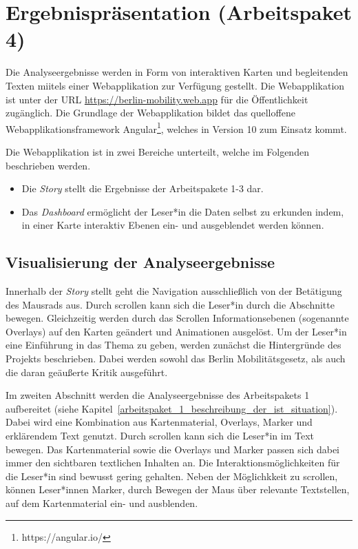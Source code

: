 \newpage

\section{Ergebnispräsentation (Arbeitspaket 4)}
\label{ergebnispraesentation}

Die Analyseergebnisse werden in Form von interaktiven Karten und begleitenden Texten miitels einer Webapplikation zur Verfügung gestellt. Die Webapplikation ist unter der URL \url{https://berlin-mobility.web.app} für die Öffentlichkeit zugänglich. Die Grundlage der Webapplikation bildet das quelloffene Webapplikationsframework Angular\footnote{https://angular.io/}, welches in Version 10 zum Einsatz kommt.


Die Webapplikation ist in zwei Bereiche unterteilt, welche im Folgenden beschrieben werden.

\begin{itemize}
    \item Die \emph{Story} stellt die Ergebnisse der Arbeitspakete 1-3 dar.
    \item Das \emph{Dashboard} ermöglicht der Leser*in die Daten selbst zu erkunden indem, in einer Karte interaktiv Ebenen ein- und ausgeblendet werden können.
\end{itemize}

\subsection{Visualisierung der Analyseergebnisse}
\label{visualisierung_der_analyseergebnisse}

Innerhalb der \emph{Story} stellt geht die Navigation ausschließlich von der Betätigung des Mausrads aus. Durch scrollen kann sich die Leser*in durch die Abschnitte bewegen. Gleichzeitig werden durch das Scrollen Informationsebenen (sogenannte Overlays) auf den Karten geändert und Animationen ausgelöst. Um der Leser*in eine Einführung in das Thema zu geben, werden zunächst die Hintergründe des Projekts beschrieben. Dabei werden sowohl das Berlin Mobilitätsgesetz, als auch die daran geäußerte Kritik ausgeführt.

Im zweiten Abschnitt werden die Analyseergebnisse des Arbeitspakets 1 aufbereitet (siehe Kapitel~\ref{arbeitspaket_1_beschreibung_der_ist_situation}). Dabei wird eine Kombination aus Kartenmaterial, Overlays, Marker und erklärendem Text genutzt. Durch scrollen kann sich die Leser*in im Text bewegen. Das Kartenmaterial sowie die Overlays und Marker passen sich dabei immer den sichtbaren textlichen Inhalten an. Die Interaktionsmöglichkeiten für die Leser*in sind bewusst gering gehalten. Neben der Möglichkkeit zu scrollen, können Leser*innen Marker, durch Bewegen der Maus über relevante Textstellen, auf dem Kartenmaterial ein- und ausblenden.

